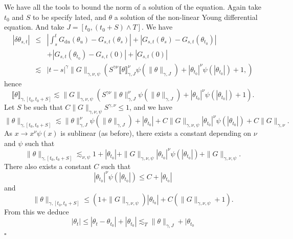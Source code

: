\documentclass[a4paper,11pt]{article}
\newcommand{\mathd}{\mathrm{d}}
\newenvironment{proof}{{\sc Proof.}}{\hfill$\square$}
\begin{document}
\begin{proof}
  We have all the tools to bound the norm of a solution of the equation. Again
  take $t_{0}$ and $S$ to be specify lated, and $\theta$ a solution of the
  non-linear Young differential equation. And take $J= [ t_{0} , ( t_{0} +S )
  \wedge T ]$. We have
  \begin{eqnarray*}
    | \delta \theta_{s,t} | & \leqslant & \left\lvert \int_{s}^{t} G_{\mathd u} (
    \theta_{u} ) -G_{s,t} ( \theta_{s} ) \right\lvert + | G_{s,t} ( \theta_{s} )
    -G_{s,t} ( \theta_{t_{0}} ) | \\
    & & + | G_{s,t} ( \theta_{t_{0}} ) -G_{s,t} ( 0
    ) | + | G_{s,t} ( 0 ) |\\
    & \lesssim & | t-s |^{\gamma} \| G \|_{\gamma , \nu , \psi} ( S^{\gamma
    \nu} \llbracket \theta \rrbracket_{\gamma ,J}^{\nu} \psi ( \| \theta
    \|_{\gamma ,J} ) + | \theta_{t_{0}} |^{\nu} \psi ( | \theta_{t_{0}} | ) +1,
    )
  \end{eqnarray*}
  hence
  \[ \llbracket \theta \rrbracket_{\gamma , [ t_{0} ,t_{0} +S ]} \lesssim \| G
     \|_{\gamma , \nu , \psi} ( S^{\gamma \nu} \| \theta \|_{\gamma ,J}^{\nu}
     \psi ( \| \theta \|_{\gamma ,J} ) + | \theta_{t_{0}} |^{\nu} \psi ( |
     \theta_{t_{0}} | ) +1 ) . \]
  Let $S$ be such that $C \| G \|_{\gamma , \nu , \psi} S^{\gamma , \nu}
  \leqslant 1$, and we have
  \[ \| \theta \|_{\gamma , [ t_{0} ,t_{0} +S ]} \lesssim \| \theta \|_{\gamma
     ,J}^{\nu} \psi ( \| \theta \|_{\gamma ,J} ) + | \theta_{t_{0}} | +C \| G
     \|_{\gamma , \nu , \psi} | \theta_{t_{0}} |^{\nu} \psi ( | \theta_{t_{0}}
     | ) +C \| G \|_{\gamma , \nu} .\]
  As $x \rightarrow x^{\nu} \psi ( x )$ is sublinear (as before), there
  exists a constant depending on $\nu$ and $\psi$ such that
  \[ \| \theta \|_{\gamma , [ t_{0} ,t_{0} +S ]} \lesssim_{\nu , \psi} 1+ |
     \theta_{t_{0}} | + \| G \|_{\gamma , \nu , \psi} | \theta_{t_{0}} |^{\nu}
     \psi ( | \theta_{t_{0}} | ) + \| G \|_{\gamma , \nu , \psi} . \]
  There also exists a constant $C$ such that
  \[ | \theta_{t_{0}} |^{\nu} \psi ( | \theta_{t_{0}} | ) \leqslant C+ |
     \theta_{t_{0}} | \]
  and
  \begin{equation}
    \| \theta \|_{\gamma , [ t_{0} ,t_{0} +S ]} \leqslant ( 1+ \| G \|_{\gamma
    , \nu , \psi} ) | \theta_{t_{0}} | +C ( \| G \|_{\gamma , \nu , \psi} +1 )
    . \label{eq:estimation-holder-norm-colutions}
  \end{equation}
  From this we deduce
  \[ | \theta_{t} | \leqslant | \theta_{t} - \theta_{t_{0}} | + |
     \theta_{t_{0}} | \lesssim_{T} \| \theta \|_{\gamma ,J} + | \theta_{t_{0}}
\]
\end{proof}
\end{document}
